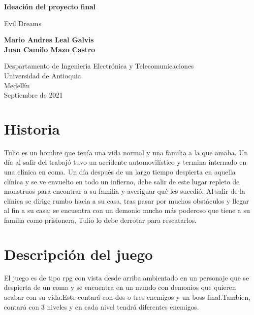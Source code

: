 \documentclass{article}
\begin{document}
\begin{titlepage}
    \begin{center}
        \vspace*{1cm}
            
        \Huge
        \textbf{Ideación del proyecto final}
            
        \vspace{0.5cm}
        \LARGE
        Evil Dreams
            
        \vspace{1.5cm}
            
        \textbf{Mario Andres Leal Galvis\\
        Juan Camilo Mazo Castro}
            
        \vfill
            
        \vspace{0.8cm}
            
        \Large
        Despartamento de Ingeniería Electrónica y Telecomunicaciones\\
        Universidad de Antioquia\\
        Medellín\\
        Septiembre de 2021
            
    \end{center}
\end{titlepage}

\tableofcontents
\newpage
\section{Historia}
Tulio es un hombre que tenía una vida normal y una familia a la que amaba. Un día al salir del trabajó tuvo un accidente automovilístico y termina internado en una clínica en coma. Un día después de un largo tiempo despierta en aquella clínica y se ve envuelto en todo un infierno, debe salir de este lugar repleto de monstruos para encontrar a su familia y averiguar qué les sucedió. Al salir de la clínica se dirige rumbo hacia a su casa, tras pasar por muchos obstáculos y llegar al fin a su casa; se encuentra con un demonio mucho más poderoso que tiene a su familia como prisionera, Tulio lo debe derrotar para rescatarlos.
\newpage

\section{Descripción del juego} \label{contenido1} 
El juego es de tipo rpg con vista desde arriba.ambientado en un personaje que se despierta de un coma y se encuentra en un mundo con demonios que quieren acabar con su vida.Este contará con dos o tres enemigos y un boss final.Tambien, contará con 3 niveles y en cada nivel tendrá diferentes enemigos.\\
\end{document}
